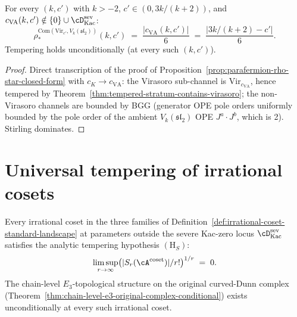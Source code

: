 \begin{proposition}
\label{prop:vir-affine-coset-rho-star}
\ClaimStatusProvedHere
For every $(k, c')$ with $k > -2$, $c' \in (0, 3 k / (k + 2))$, and
$c_{\mathrm{VA}}(k, c') \notin \{0\} \cup \cD^{\mathrm{sev}}_{\mathrm{Kac}}$:
\[
 \rho_*^{\mathrm{Com}(\mathrm{Vir}_{c'}, V_k(\mathfrak{sl}_2))}(k, c')
 \;=\;
 \frac{\lvert c_{\mathrm{VA}}(k, c') \rvert}{6}
 \;=\;
 \frac{\lvert 3 k / (k + 2) - c' \rvert}{6}.
\]
Tempering holds unconditionally (at every such $(k, c')$).
\end{proposition}

\begin{proof}
Direct transcription of the proof of
Proposition~\ref{prop:parafermion-rho-star-closed-form} with
$c_K \to c_{\mathrm{VA}}$: the Virasoro sub-channel is
$\mathrm{Vir}_{c_{\mathrm{VA}}}$, hence tempered by
Theorem~\ref{thm:tempered-stratum-contains-virasoro}; the non-
Virasoro channels are bounded by BGG (generator OPE pole orders
uniformly bounded by the pole order of the ambient
$V_k(\mathfrak{sl}_2)$ OPE $J^a \cdot J^b$, which is 2). Stirling
dominates.
\end{proof}

\section{Universal tempering of irrational cosets}
\label{sec:universal-tempering-irrational}

\begin{theorem}
\label{thm:irrational-coset-tempered}
\ClaimStatusProvedHere
Every irrational coset in the three families of
Definition~\ref{def:irrational-coset-standard-landscape} at
parameters outside the severe Kac-zero locus
$\cD^{\mathrm{sev}}_{\mathrm{Kac}}$ satisfies the analytic tempering
hypothesis $(\mathrm{H}_S)$:
\[
 \limsup_{r \to \infty}
 \bigl( \lvert S_r(\cA^{\mathrm{coset}}) \rvert / r! \bigr)^{1/r}
 \;=\; 0.
\]
The chain-level $E_3$-topological structure on the original
curved-Dunn complex
(Theorem~\ref{thm:chain-level-e3-original-complex-conditional})
exists unconditionally at every such irrational coset.
\end{theorem}

